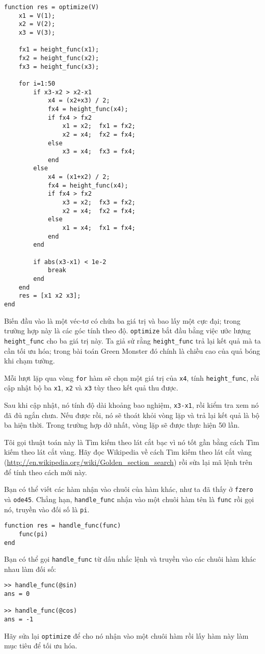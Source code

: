\documentclass[12pt]{book}
\begin{document}
\begin{verbatim}
function res = optimize(V)
    x1 = V(1);
    x2 = V(2);
    x3 = V(3);
    
    fx1 = height_func(x1);
    fx2 = height_func(x2);
    fx3 = height_func(x3);
   
    for i=1:50
        if x3-x2 > x2-x1
            x4 = (x2+x3) / 2;
            fx4 = height_func(x4);
            if fx4 > fx2
                x1 = x2;  fx1 = fx2;
                x2 = x4;  fx2 = fx4;
            else
                x3 = x4;  fx3 = fx4;
            end
        else
            x4 = (x1+x2) / 2;
            fx4 = height_func(x4);
            if fx4 > fx2
                x3 = x2;  fx3 = fx2;
                x2 = x4;  fx2 = fx4;
            else
                x1 = x4;  fx1 = fx4;
            end
        end

        if abs(x3-x1) < 1e-2
            break
        end
    end
    res = [x1 x2 x3];
end
\end{verbatim}
%
Biến đầu vào là một véc-tơ có chứa ba giá trị và bao lấy một cực đại;
trong trường hợp này là các góc tính theo độ. {\tt optimize} bắt đầu 
bằng việc ước lượng \verb#height_func# cho ba giá trị này.
Ta giả sử rằng \verb#height_func# trả lại kết quả mà ta cần 
tối ưu hóa; trong bài toán Green Monster đó chính là chiều cao của 
quả bóng khi chạm tường.

Mỗi lượt lặp qua vòng {\tt for} hàm sẽ chọn một giá trị của {\tt x4}, 
tính  \verb#height_func#, rồi cập nhật bộ ba {\tt x1}, {\tt x2} và 
{\tt x3} tùy theo kết quả thu được.

Sau khi cập nhật, nó tính độ dài khoảng bao nghiệm, {\tt x3-x1},
rồi kiểm tra xem nó đã đủ ngắn chưa. Nếu được rồi, nó sẽ thoát khỏi 
vòng lặp và trả lại kết quả là bộ ba hiện thời. Trong trường hợp dở nhất, 
vòng lặp sẽ được thực hiện 50 lần.

\begin{ex}
Tôi gọi thuật toán này là Tìm kiếm theo lát cắt bạc vì nó tốt gần bằng 
cách Tìm kiếm theo lát cắt vàng. Hãy đọc Wikipedia về cách Tìm 
kiếm theo lát cắt vàng 
(\url{http://en.wikipedia.org/wiki/Golden_section_search}) rồi sửa lại 
mã lệnh trên để tính theo cách mới này.
\end{ex}

\begin{ex}
Bạn có thể viết các hàm nhận vào chuôi của hàm khác, như ta đã thấy  
ở {\tt fzero} và {\tt ode45}. Chẳng hạn, \verb#handle_func# nhận vào 
một chuôi hàm tên là {\tt func} rồi gọi nó, truyền vào đối số là  {\tt pi}.

\begin{verbatim}
function res = handle_func(func)
    func(pi)
end
\end{verbatim}
%
Bạn có thể gọi \verb#handle_func# từ dấu nhắc lệnh và truyền
vào các chuôi hàm khác nhau làm đối số:

\begin{verbatim}
>> handle_func(@sin)
ans = 0

>> handle_func(@cos)
ans = -1
\end{verbatim}
%
Hãy sửa lại {\tt optimize} để cho nó nhận vào một chuôi hàm rồi 
lấy hàm này làm mục tiêu để tối ưu hóa.
\end{ex}
\end{document}
